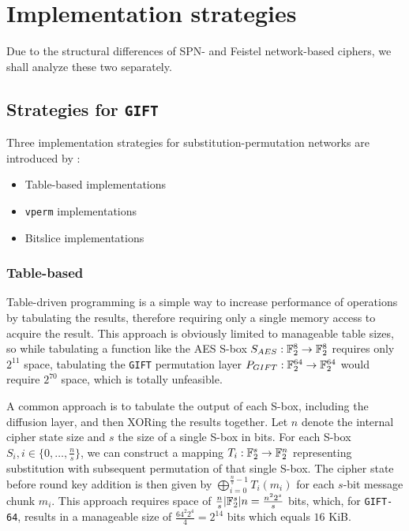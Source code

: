 \chapter{Implementation strategies}

Due to the structural differences of SPN- and Feistel network-based ciphers, we
shall analyze these two separately.

\section{Strategies for \texttt{GIFT}}

Three implementation strategies for substitution-permutation networks are
introduced by \cite{implx86:2014}:

\begin{itemize}
    \item Table-based implementations
    \item \texttt{vperm} implementations
    \item Bitslice implementations
\end{itemize}

\subsection{Table-based}

Table-driven programming is a simple way to increase performance of operations
by tabulating the results, therefore requiring only a single memory access to
acquire the result. This approach is obviously limited to manageable table
sizes, so while tabulating a function like the AES S-box
$S_{AES}:\mathbb{F}_2^{8}\rightarrow \mathbb{F}_2^{8}$ requires only $2^{11}$ space,
tabulating the \texttt{GIFT} permutation layer
$P_{GIFT}:\mathbb{F}_2^{64}\rightarrow \mathbb{F}_2^{64}$ would require
$2^{70}$ space, which is totally unfeasible.

A common approach is to tabulate the output of each S-box, including the
diffusion layer, and then XORing the results together. Let $n$ denote the
internal cipher state size and $s$ the size of a single S-box in bits. For each
S-box $S_i,i\in\{0,\dots,\frac{n}{s}\}$, we can construct a mapping
$T_i:\mathbb{F}_2^{s}\rightarrow \mathbb{F}_2^{n}$ representing substitution with subsequent
permutation of that single S-box. The cipher state before round key addition is
then given by $\bigoplus_{i=0}^{\frac{n}{s}-1}{T_i(m_i)}$ for each $s$-bit
message chunk $m_i$. This approach requires space of
$\frac{n}{s}|\mathbb{F}_2^{s}|n=\frac{n^2 2^s}{s}$ bits, which, for \texttt{GIFT-64},
results in a manageable size of $\frac{64^2 2^4}{4}=2^{14}$ bits which equals
$16$ KiB.


